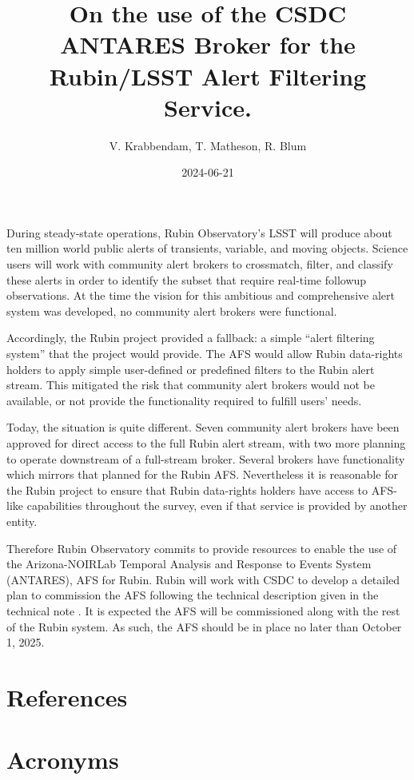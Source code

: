 \documentclass[DM,authoryear]{lsstdoc}
\title{On the use of the CSDC ANTARES Broker for the Rubin/LSST Alert Filtering Service.}
\author{V. Krabbendam, T. Matheson, R. Blum}
\date{2024-06-21}
\begin{document}
        
\mkmemotitle

During steady-state operations, Rubin Observatory's LSST will produce about ten million world public alerts of transients, variable, and moving objects. Science users will work with community alert
brokers to crossmatch, filter, and classify these alerts in order to identify the subset that require real-time followup observations. 
At the time the vision for this ambitious and comprehensive alert system was developed, no community alert brokers were functional.

Accordingly, the Rubin project provided a fallback: a simple “alert filtering system” that the project would provide. 
The AFS would allow Rubin data-rights holders to apply simple user-defined or predefined filters to the Rubin alert stream. 
This mitigated the risk that community alert brokers would not be available, or not provide the functionality required to fulfill users' needs.

Today, the situation is quite different. 
Seven community alert brokers have been approved for direct access to the full Rubin alert stream, with two more planning to operate downstream of a full-stream broker. 
Several brokers have functionality which mirrors that planned for the Rubin AFS. 
Nevertheless it is reasonable for the Rubin project to ensure that Rubin data-rights holders have access to AFS-like capabilities throughout the survey, even if that service is provided by another entity.

Therefore Rubin Observatory commits to provide resources to enable the use of the Arizona-NOIRLab Temporal Analysis and Response to Events System (ANTARES),   \citep{2021AJ....161..107M} AFS for Rubin. 
Rubin will work with CSDC to develop a detailed plan to commission the AFS following the technical description given in the  technical note . 
It is expected the AFS will be commissioned along with the rest of the Rubin system. 
As such, the AFS should be in place no later than October 1, 2025.

\clearpage
\appendix
\section{References} \label{sec:bib}
\renewcommand{\refname}{} %


\section{Acronyms} \label{sec:acronyms}

\end{document}
